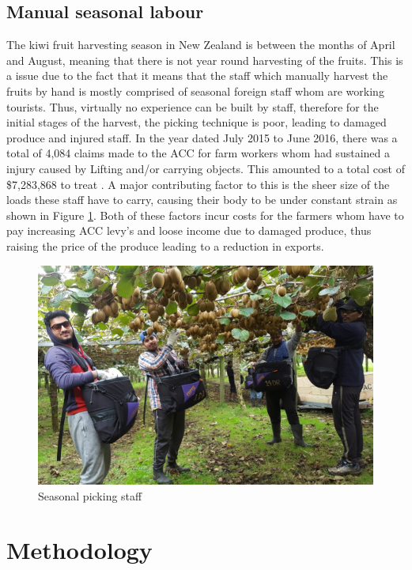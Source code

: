 \documentclass[11pt]{article}
\begin{document}
\subsection{Manual seasonal labour}
The kiwi fruit harvesting season in New Zealand is between the months of April and August, meaning that there is not year round harvesting of the fruits. This is a issue due to the fact that it means that the staff which manually harvest the fruits by hand is mostly comprised of seasonal foreign staff whom are working tourists. Thus, virtually no experience can be built by staff, therefore for the initial stages of the harvest, the picking technique is poor, leading to damaged produce and injured staff. In the year dated July 2015 to June 2016, there was a total of 4,084 claims made to the ACC for farm workers whom had sustained a injury caused by Lifting and/or carrying objects. This amounted to a total cost of \$7,283,868 to treat \cite{injury_statistics_tool_2017}. A major contributing factor to this is the sheer size of the loads these staff have to carry, causing their body to be under constant strain as shown in Figure \ref{fig:Picking}.  Both of these factors incur costs for the farmers whom have to pay increasing ACC levy's and loose income due to damaged produce, thus raising the price of the produce leading to a reduction in exports.
\begin{figure}[h]
\centering
\includegraphics[scale=0.2]{Pickers}
\caption{Seasonal picking staff}
\label{fig:Picking}
\end{figure}

\section{Methodology}
\end{document}
